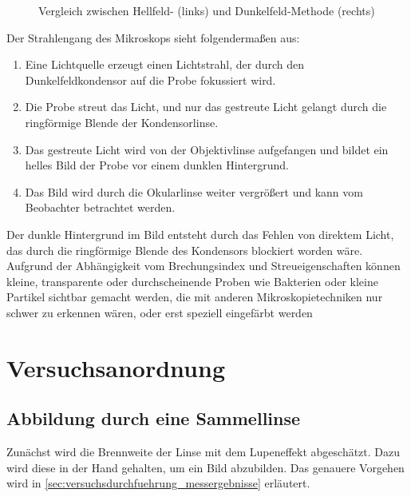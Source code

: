 \documentclass[12pt,english,ngerman]{scrartcl}
\begin{document}
\begin{figure}[H]
	\begin{center}
	\end{center}
	\caption[Vergleich zwischen Hellfeld- (links) und Dunkelfeld-Methode (rechts)] {
		Vergleich zwischen Hellfeld- (links) und Dunkelfeld-Methode (rechts)
	}\label{fig:strahlengang_dunkelfeldmikroskop}
\end{figure}

Der Strahlengang des Mikroskops sieht folgendermaßen aus:

\begin{enumerate}
	\item Eine Lichtquelle erzeugt einen Lichtstrahl, der durch den Dunkelfeldkondensor
	      auf die Probe fokussiert wird.
	\item Die Probe streut das Licht, und nur das gestreute Licht gelangt durch die
	      ringförmige Blende der Kondensorlinse.
	\item Das gestreute Licht wird von der Objektivlinse aufgefangen und bildet ein
	      helles Bild der Probe vor einem dunklen Hintergrund.
	\item Das Bild wird durch die Okularlinse weiter vergrößert und kann vom Beobachter
	      betrachtet werden.
\end{enumerate}

Der dunkle Hintergrund im Bild entsteht durch das Fehlen von direktem Licht,
das durch die ringförmige Blende des Kondensors blockiert worden wäre. Aufgrund
der Abhängigkeit vom Brechungsindex und Streueigenschaften können kleine,
transparente oder durchscheinende Proben wie Bakterien oder kleine Partikel
sichtbar gemacht werden, die mit anderen Mikroskopietechniken nur schwer zu
erkennen wären, oder erst speziell eingefärbt werden

\section{Versuchsanordnung}\label{sec:versuchsanordnung}

\subsection{Abbildung durch eine Sammellinse}

Zunächst wird die Brennweite der Linse mit dem Lupeneffekt abgeschätzt. Dazu
wird diese in der Hand gehalten, um ein Bild abzubilden. Das genauere Vorgehen
wird in \autoref{sec:versuchsdurchfuehrung_messergebnisse} erläutert.
\end{document}
